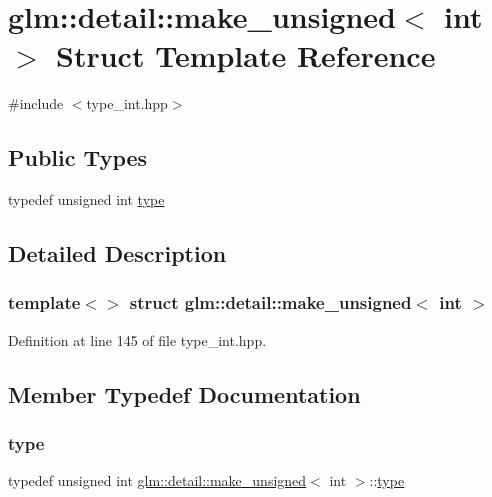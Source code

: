 \hypertarget{structglm_1_1detail_1_1make__unsigned_3_01int_01_4}{}\section{glm\+::detail\+::make\+\_\+unsigned$<$ int $>$ Struct Template Reference}
\label{structglm_1_1detail_1_1make__unsigned_3_01int_01_4}


{\ttfamily \#include $<$type\+\_\+int.\+hpp$>$}

\subsection*{Public Types}
\begin{DoxyCompactItemize}
\item 
typedef unsigned int \mbox{\hyperlink{structglm_1_1detail_1_1make__unsigned_3_01int_01_4_ac3fd57ed35c0305bbe941009a84139c1}{type}}
\end{DoxyCompactItemize}


\subsection{Detailed Description}
\subsubsection*{template$<$$>$\newline
struct glm\+::detail\+::make\+\_\+unsigned$<$ int $>$}



Definition at line 145 of file type\+\_\+int.\+hpp.



\subsection{Member Typedef Documentation}
\mbox{\label{structglm_1_1detail_1_1make__unsigned_3_01int_01_4_ac3fd57ed35c0305bbe941009a84139c1}} 
\subsubsection{\texorpdfstring{type}{type}}
{\footnotesize\ttfamily typedef unsigned int \mbox{\hyperlink{structglm_1_1detail_1_1make__unsigned}{glm\+::detail\+::make\+\_\+unsigned}}$<$ int $>$\+::\mbox{\hyperlink{structglm_1_1detail_1_1make__unsigned_3_01int_01_4_ac3fd57ed35c0305bbe941009a84139c1}{type}}}



